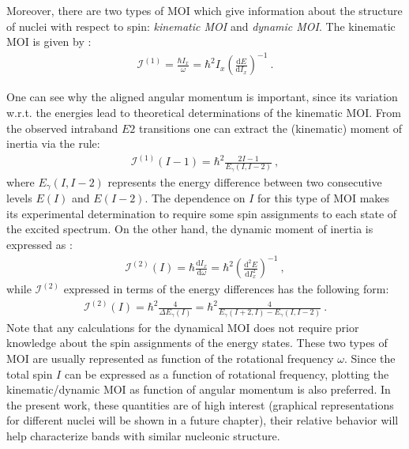 Moreover, there are two types of MOI which give information about the structure of nuclei with respect to spin: \emph{kinematic MOI} and \emph{dynamic MOI}. The kinematic MOI is given by \cite{wu1992relation}:
\begin{align}
    \mathcal{I}^{(1)}=\frac{\hbar I_x}{\omega}=\hbar^2 I_x\left(\frac{\text{d}E}{\text{d}I_x}\right)^{-1}\ .
    \label{kinematic-moi-general}
\end{align}

One can see why the aligned angular momentum is important, since its variation w.r.t. the energies lead to theoretical determinations of the kinematic MOI. From the observed intraband $E2$ transitions one can extract the (kinematic) moment of inertia via the rule:
\begin{align}
    \mathcal{I}^{(1)}(I-1)=\hbar^2\frac{2I-1}{E_\gamma(I,I-2)}\ ,
    \label{kinematic-moi-energy-levels}
\end{align}
where $E_\gamma(I,I-2)$ represents the energy difference between two consecutive levels $E(I)$ and $E(I-2)$. The dependence on $I$ for this type of MOI makes its experimental determination to require some spin assignments to each state of the excited spectrum. On the other hand, the dynamic moment of inertia is expressed as \cite{wu1992relation}:
\begin{align}
    \mathcal{I}^{(2)}(I)=\hbar\frac{\text{d}I_x}{\text{d}\omega}=\hbar^2\left(\frac{\text{d}^2E}{\text{d}I_x^2}\right)^{-1}\ ,
    \label{dynamic-moi-general}
\end{align}
while $\mathcal{I}^{(2)}$ expressed in terms of the energy differences has the following form:
\begin{align}
    \mathcal{I}^{(2)}(I)=\hbar^2\frac{4}{\Delta E_\gamma(I)}=\hbar^2\frac{4}{E_\gamma(I+2,I)-E_\gamma(I,I-2)}\ .
    \label{dynamic-moi-energy-levels}
\end{align}
Note that any calculations for the dynamical MOI does not require prior knowledge about the spin assignments of the energy states. These two types of MOI are usually represented as function of the rotational frequency $\omega$. Since the total spin $I$ can be expressed as a function of rotational frequency, plotting the kinematic/dynamic MOI as function of angular momentum is also preferred. In the present work, these quantities are of high interest (graphical representations for different nuclei will be shown in a future chapter), their relative behavior will help characterize bands with similar nucleonic structure.

